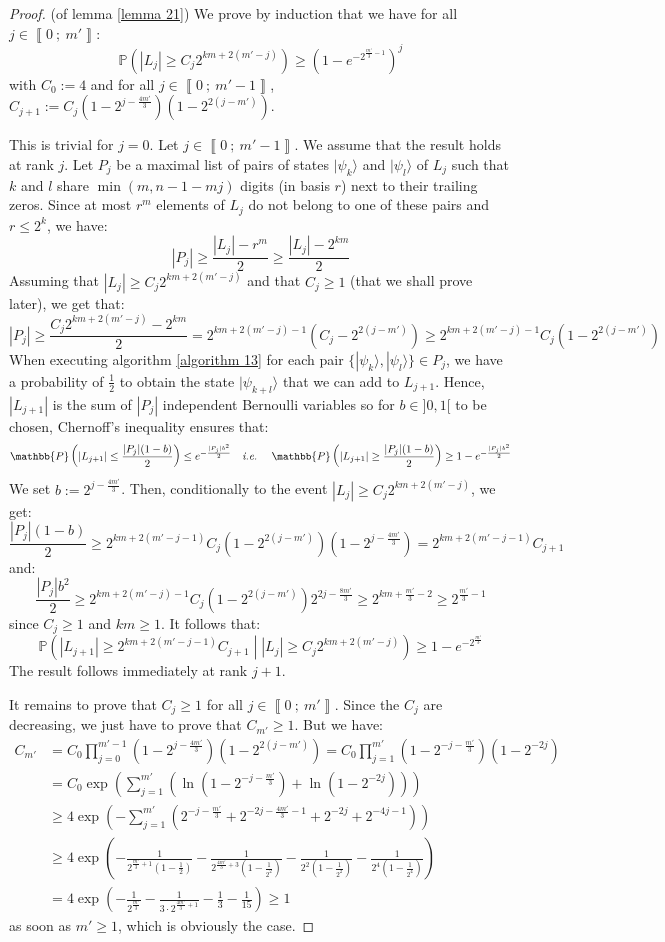 \documentclass[a4paper,10pt]{report}
\theoremstyle{definition}
\theoremstyle{plain}
\theoremstyle{definition}
\newcommand{\ie}{\emph{i.e.}\ }
\renewcommand{\i}[2]{\left\llbracket #1~;~#2\right\rrbracket}
\renewcommand{\(}{\left(}
\renewcommand{\)}{\right)}
\renewcommand{\P}{\mathbb{P}}
\begin{document}
\begin{proof} (of lemma \ref{lemma 21})
We prove by induction that we have for all $j\in\i{0}{m'}$:
\[\P\(|L_j|\geq C_j 2^{km+2(m'-j)}\)\geq \(1-e^{-2^{\frac{m'}{3}-1}}\)^j\]
with $C_0:=4$ and for all $j\in\i{0}{m'-1}$, $C_{j+1}:=C_j(1-2^{j-\frac{4m'}{3}})(1-2^{2(j-m')})$. 

This is trivial for $j=0$. Let $j\in\i{0}{m'-1}$. We assume that the result holds at rank $j$. Let $P_j$ be a maximal list of pairs of states $|\psi_k\rangle$ and $|\psi_l\rangle$ of $L_j$ such that $k$ and $l$ share $\min(m,n-1-mj)$ digits (in basis $r$) next to their trailing zeros. Since at most $r^m$ elements of $L_j$ do not belong to one of these pairs and $r\leq 2^k$, we have:
\[|P_j|\geq \frac{|L_j|-r^m}{2}\geq \frac{|L_j|-2^{km}}{2}\]
Assuming that $|L_j|\geq C_j 2^{km+2(m'-j)}$ and that $C_j\geq 1$ (that we shall prove later), we get that:
\[|P_j|\geq \frac{C_j 2^{km+2(m'-j)} -2^{km}}{2}=2^{km+2(m'-j)-1}(C_j-2^{2(j-m')})\geq 2^{km+2(m'-j)-1}C_j(1-2^{2(j-m')}) \] 
When executing algorithm \ref{algorithm 13} for each pair $\{|\psi_k\rangle, |\psi_l\rangle\}\in P_j$, we have a probability of $\frac{1}{2}$ to obtain the state $|\psi_{k+l}\rangle$ that we can add to $L_{j+1}$. Hence, $|L_{j+1}|$ is the sum of $|P_j|$ independent Bernoulli variables so for $b\in]0,1[$ to be chosen, Chernoff's inequality ensures that:
\[\P\(|L_{j+1}|\leq \frac{|P_j|(1-b)}{2}\)\leq e^{-\frac{|P_j|b^2}{2}} \quad \mbox{\ie} \quad \P\(|L_{j+1}|\geq \frac{|P_j|(1-b)}{2}\)\geq 1-e^{-\frac{|P_j|b^2}{2}}\]
We set $b:=2^{j-\frac{4m'}{3}}$. Then, conditionally to the event $|L_j|\geq C_j 2^{km+2(m'-j)}$, we get:
\[\frac{|P_j|(1-b)}{2}\geq 2^{km+2(m'-j-1)}C_j(1-2^{2(j-m')})(1-2^{j-\frac{4m'}{3}})= 2^{km+2(m'-j-1)}C_{j+1}\]
and:
\[\frac{|P_j|b^2}{2}\geq 2^{km+2(m'-j)-1}C_j(1-2^{2(j-m')})2^{2j-\frac{8m'}{3}}\geq 2^{km+\frac{m'}{3}-2}\geq 2^{\frac{m'}{3}-1}\]
since $C_j\geq 1$ and $km\geq 1$. It follows that:
\[\P\(|L_{j+1}|\geq 2^{km+2(m'-j-1)}C_{j+1}\middle| |L_j|\geq C_j 2^{km+2(m'-j)} \)\geq 1-e^{-2^{\frac{m'}{3}}}\]
The result follows immediately at rank $j+1$. 

It remains to prove that $C_j\geq 1$ for all $j\in\i{0}{m'}$. Since the $C_j$ are decreasing, we just have to prove that $C_{m'}\geq 1$. But we have:
\begin{align*}
C_{m'}&=C_0\prod_{j=0}^{m'-1}\(1-2^{j-\frac{4m'}{3}}\)\(1-2^{2(j-m')}\)=C_0\prod_{j=1}^{m'}\(1-2^{-j-\frac{m'}{3}}\)\(1-2^{-2j}\)\\
&=C_0\exp\(\sum_{j=1}^{m'}\(\ln\(1-2^{-j-\frac{m'}{3}}\)+\ln\(1-2^{-2j}\)\)\)\\
&\geq 4\exp\(-\sum_{j=1}^{m'}\(2^{-j-\frac{m'}{3}}+2^{-2j-\frac{4m'}{3}-1}+2^{-2j}+2^{-4j-1}\)\)\\
&\geq 4\exp\(-\frac{1}{2^{\frac{m'}{3}+1}\(1-\frac{1}{2}\)}-\frac{1}{2^{\frac{4m'}{3}+3}\(1-\frac{1}{2^2}\)}-\frac{1}{2^{2}\(1-\frac{1}{2^2}\)}-\frac{1}{2^{4}\(1-\frac{1}{2^4}\)}\)\\
&= 4\exp\(-\frac{1}{2^{\frac{m'}{3}}}-\frac{1}{3\cdot 2^{\frac{4m'}{3}+1}}-\frac{1}{3}-\frac{1}{15}\)\geq 1
\end{align*}
as soon as $m'\geq 1$, which is obviously the case.
\end{proof}
\end{document}
